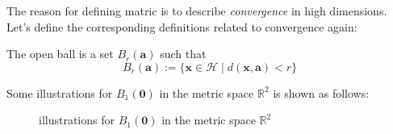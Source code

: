 The reason for defining matric is to describe \emph{convergence} in high dimensions. Let's define the corresponding definitions related to convergence again:
\begin{definition}
The open ball is a set $B_r(\bm a)$ such that
\begin{equation}
B_r(\bm a):=\{\bm x\in\mathcal{H}\mid d(\bm x,\bm a)<r\}
\end{equation}
\end{definition}
Some illustrations for $B_1(\bm0)$ in the metric space $\mathbb{R}^2$ is shown as follows:

\begin{figure} 
  \centering 
  \hspace{1in} 
  \label{fig:subfig} %
  \caption{illustrations for $B_1(\bm0)$ in the metric space $\mathbb{R}^2$} 
\end{figure}
